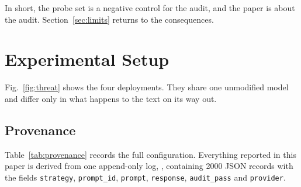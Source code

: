 \documentclass[journal]{IEEEtran}
\theoremstyle{definition}
\newcommand{\Nrows}{2000}
\begin{document}
In short, the probe set is a negative control for the audit, and the paper is
about the audit. Section~\ref{sec:limits} returns to the consequences.

\section{Experimental Setup}
\label{sec:setup}
Fig.~\ref{fig:threat} shows the four deployments. They share one unmodified
model and differ only in what happens to the text on its way out.


\subsection{Provenance}

Table~\ref{tab:provenance} records the full configuration. Everything reported in
this paper is derived from one append-only log,
, containing \Nrows{} JSON records with
the fields \texttt{strategy}, \texttt{prompt\_id}, \texttt{prompt},
\texttt{response}, \texttt{audit\_pass} and \texttt{provider}.
\end{document}
